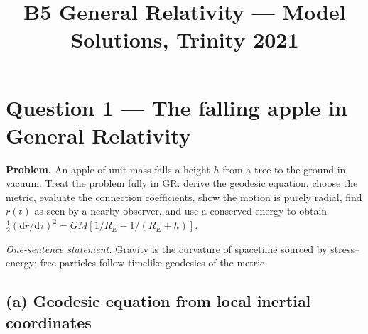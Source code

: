 \documentclass[11pt]{article}
\title{B5 General Relativity --- Model Solutions, Trinity 2021}
\author{}
\date{}
\newcommand{\de}{\mathrm{d}}
\begin{document}
\maketitle

\section*{Question 1 --- The falling apple in General Relativity}

\textbf{Problem.} An apple of unit mass falls a height $h$ from a tree to the ground in vacuum. Treat the problem fully in GR: derive the geodesic equation, choose the metric, evaluate the connection coefficients, show the motion is purely radial, find $r(t)$ as seen by a nearby observer, and use a conserved energy to obtain
\(\tfrac{1}{2}(\de r/\de\tau)^2 = GM[1/R_E - 1/(R_E+h)]\).

\medskip
\noindent\emph{One-sentence statement.} Gravity is the curvature of spacetime sourced by stress--energy; free particles follow timelike geodesics of the metric.

\subsection*{(a) Geodesic equation from local inertial coordinates}
\end{document}
